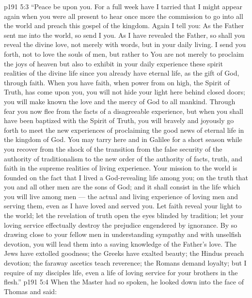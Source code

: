 \vs p191 5:3 “Peace be upon you. For a full week have I tarried that I might appear again when you were all present to hear once more the commission to go into all the world and preach this gospel of the kingdom. Again I tell you: As the Father sent me into the world, so send I you. As I have revealed the Father, so shall you reveal the divine love, not merely with words, but in your daily living. I send you forth, not to love the souls of men, but rather to  You are not merely to proclaim the joys of heaven but also to exhibit in your daily experience these spirit realities of the divine life since you already have eternal life, as the gift of God, through faith. When you have faith, when power from on high, the Spirit of Truth, has come upon you, you will not hide your light here behind closed doors; you will make known the love and the mercy of God to all mankind. Through fear you now flee from the facts of a disagreeable experience, but when you shall have been baptized with the Spirit of Truth, you will bravely and joyously go forth to meet the new experiences of proclaiming the good news of eternal life in the kingdom of God. You may tarry here and in Galilee for a short season while you recover from the shock of the transition from the false security of the authority of traditionalism to the new order of the authority of facts, truth, and faith in the supreme realities of living experience. Your mission to the world is founded on the fact that I lived a God\hyp{}revealing life among you; on the truth that you and all other men are the sons of God; and it shall consist in the life which you will live among men --- the actual and living experience of loving men and serving them, even as I have loved and served you. Let faith reveal your light to the world; let the revelation of truth open the eyes blinded by tradition; let your loving service effectually destroy the prejudice engendered by ignorance. By so drawing close to your fellow men in understanding sympathy and with unselfish devotion, you will lead them into a saving knowledge of the Father’s love. The Jews have extolled goodness; the Greeks have exalted beauty; the Hindus preach devotion; the faraway ascetics teach reverence; the Romans demand loyalty; but I require of my disciples life, even a life of loving service for your brothers in the flesh.”
\vs p191 5:4 When the Master had so spoken, he looked down into the face of Thomas and said: 

